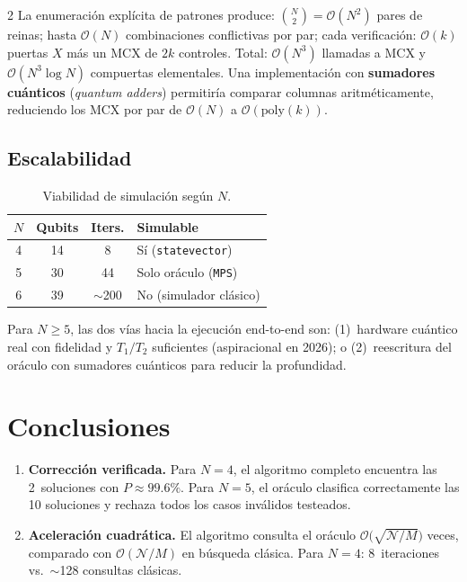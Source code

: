 \documentclass[9pt, a4paper]{extarticle}
\newcommand{\BigO}{\mathcal{O}}
\begin{document}
\begin{multicols}{2}
La enumeraci\'on expl\'icita de patrones produce:
$\binom{N}{2} = \BigO(N^2)$ pares de reinas;
hasta $\BigO(N)$ combinaciones conflictivas por par;
cada verificaci\'on: $\BigO(k)$ puertas $X$ m\'as un MCX de $2k$ controles.
Total: $\BigO(N^3)$ llamadas a MCX y $\BigO(N^3 \log N)$ compuertas elementales.
Una implementaci\'on con \textbf{sumadores cu\'anticos} (\emph{quantum adders})
permitir\'ia comparar columnas aritm\'eticamente, reduciendo los MCX
por par de $\BigO(N)$ a $\BigO(\text{poly}(k))$.

\subsection{Escalabilidad}

\begin{table}[H]
    \centering
    \caption{Viabilidad de simulaci\'on seg\'un $N$.}
    \label{tab:scale}
    \scriptsize
    \begin{tabular}{@{}cccl@{}}
        \toprule
        $N$ & Qubits & Iters. & Simulable \\
        \midrule
        4 & 14 & 8    & S\'i (\texttt{statevector}) \\
        5 & 30 & 44   & Solo or\'aculo (\texttt{MPS}) \\
        6 & 39 & $\sim$200 & No (simulador cl\'asico) \\
        \bottomrule
    \end{tabular}
\end{table}

Para $N \geq 5$, las dos v\'ias hacia la ejecuci\'on end-to-end son:
(1)~hardware cu\'antico real con fidelidad y $T_1/T_2$ suficientes
(aspiracional en 2026); o (2)~reescritura del or\'aculo con sumadores
cu\'anticos para reducir la profundidad.

\section{Conclusiones}

\begin{enumerate}
    \item \textbf{Correcci\'on verificada.}
          Para $N\!=\!4$, el algoritmo completo encuentra las 2~soluciones
          con $P \approx 99.6\%$. Para $N\!=\!5$, el or\'aculo clasifica
          correctamente las 10 soluciones y rechaza todos los casos
          inv\'alidos testeados.

    \item \textbf{Aceleraci\'on cuadr\'atica.}
          El algoritmo consulta el or\'aculo
          $\BigO\!\big(\sqrt{\mathcal{N}/M}\big)$ veces, comparado con
          $\BigO(\mathcal{N}/M)$ en b\'usqueda cl\'asica.
          Para $N\!=\!4$: 8~iteraciones vs.\ $\sim$128 consultas cl\'asicas.


\end{enumerate}
\end{multicols}
\end{document}

